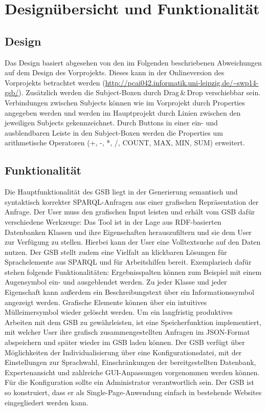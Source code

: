 \section{Designübersicht und Funktionalität}

\subsection*{Design}

Das Design basiert abgesehen von den im Folgenden beschriebenen
Abweichungen auf dem Design des Vorprojekts. Dieses kann in der
Onlineversion des Vorprojekts betrachtet werden (\url{http://pcai042.informatik.uni-leipzig.de/~swp14-gsb/}).
Zusätzlich werden die Subject-Boxen durch Drag\,\&\,Drop verschiebbar sein. Verbindungen zwischen Subjects können wie im Vorprojekt durch Properties angegeben werden und werden im Hauptprojekt durch Linien zwischen den jeweiligen Subjects gekennzeichnet.
Durch Buttons in einer ein- und ausblendbaren Leiste in den Subject-Boxen werden die Properties um arithmetische Operatoren (+, -, *, /, COUNT, MAX, MIN, SUM) erweitert.

\subsection*{Funktionalität}
Die Hauptfunktionalität des GSB liegt in der Generierung semantisch und syntaktisch korrekter SPARQL-Anfragen aus einer grafischen Repräsentation der Anfrage. Der User muss den grafischen Input leisten und erhält vom GSB dafür verschiedene Werkzeuge:
Das Tool ist in der Lage aus RDF-basierten Datenbanken Klassen und ihre Eigenschaften herauszufiltern und sie dem User zur Verfügung zu stellen. Hierbei kann der User eine Volltextsuche auf den Daten nutzen. Der GSB stellt zudem eine Vielfalt an klickbaren Lösungen für Sprachelemente aus SPARQL und für Arbeitshilfen bereit. Exemplarisch dafür stehen folgende Funktionalitäten: Ergebnisspalten können zum Beispiel mit einem Augensymbol ein- und ausgeblendet werden. Zu jeder Klasse und jeder Eigenschaft kann außerdem ein Beschreibungstext über ein Informationssymbol angezeigt werden. Grafische Elemente können über ein intuitives Mülleimersymbol wieder gelöscht werden.
Um ein langfristig produktives Arbeiten mit dem GSB zu gewährleisten, ist eine Speicherfunktion implementiert, mit welcher User ihre grafisch zusammengestellten Anfragen im JSON-Format abspeichern und später wieder im GSB laden können. 
Der GSB verfügt über Möglichkeiten der Individualisierung über eine Konfigurationsdatei, mit der Einstellungen zur Sprachwahl, Einschränkungen der bereitgestellten Datenbank, Expertenansicht und zahlreiche GUI-Anpassungen vorgenommen werden können. Für die Konfiguration sollte ein Administrator verantwortlich sein.
Der GSB ist so konstruiert, dass er als Single-Page-Anwendung einfach
in bestehende Websites eingegliedert werden kann.


